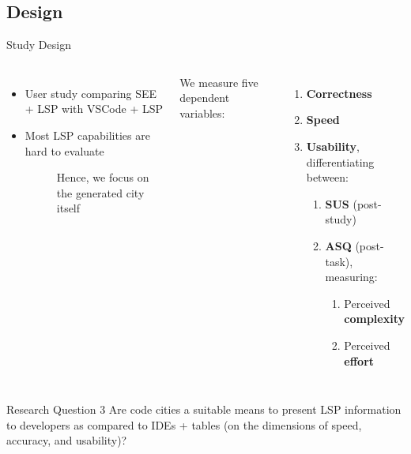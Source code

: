 \documentclass[xcolor={dvipsnames},aspectratio=169,compress,final]{beamer}
\newcommand{\follows}{\raisebox{-0.7mm}{\scalebox{1.4}{\textcolor{Maroon}{\ding{43}}}}}
\newcommand{\answer}[1]{\begin{description}\item[\follows{}]{#1}\end{description}}
\begin{document}
\subsection{Design}

\begin{frame}{Study Design}
	\begin{columns}
		\begin{itemize}
			\item User study comparing SEE + LSP with VSCode + LSP
			\item Most LSP capabilities are hard to evaluate
			      \answer{\small Hence, we focus on the generated city itself}
		\end{itemize}

		We measure five dependent variables:
		\begin{enumerate}
			\item \textbf{Correctness}
			\item \textbf{Speed}
			\item \textbf{Usability}, differentiating between:
			      \begin{enumerate}
				      \item \textbf{SUS} (post-study)
				      \item \textbf{ASQ} (post-task), measuring:
				            \begin{enumerate}
					            \item Perceived \textbf{complexity}
					            \item Perceived \textbf{effort}
				            \end{enumerate}
			      \end{enumerate}
		\end{enumerate}
	\end{columns}

	\begin{block}{Research Question 3}
		Are code cities a suitable means to present LSP information to developers as compared to IDEs + tables (on the dimensions of speed, accuracy, and usability)?
	\end{block}

\end{frame}
\end{document}
